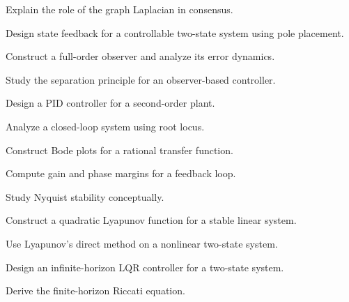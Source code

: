 \begin{exercise}[3]
Explain the role of the graph Laplacian in consensus.
\end{exercise}

\begin{exercise}[4]
Design state feedback for a controllable two-state system using pole
placement.
\end{exercise}

\begin{exercise}[4]
Construct a full-order observer and analyze its error dynamics.
\end{exercise}

\begin{exercise}[4]
Study the separation principle for an observer-based controller.
\end{exercise}

\begin{exercise}[4]
Design a PID controller for a second-order plant.
\end{exercise}

\begin{exercise}[4]
Analyze a closed-loop system using root locus.
\end{exercise}

\begin{exercise}[4]
Construct Bode plots for a rational transfer function.
\end{exercise}

\begin{exercise}[4]
Compute gain and phase margins for a feedback loop.
\end{exercise}

\begin{exercise}[4]
Study Nyquist stability conceptually.
\end{exercise}

\begin{exercise}[4]
Construct a quadratic Lyapunov function for a stable linear system.
\end{exercise}

\begin{exercise}[4]
Use Lyapunov's direct method on a nonlinear two-state system.
\end{exercise}

\begin{exercise}[4]
Design an infinite-horizon LQR controller for a two-state system.
\end{exercise}

\begin{exercise}[4]
Derive the finite-horizon Riccati equation.
\end{exercise}

